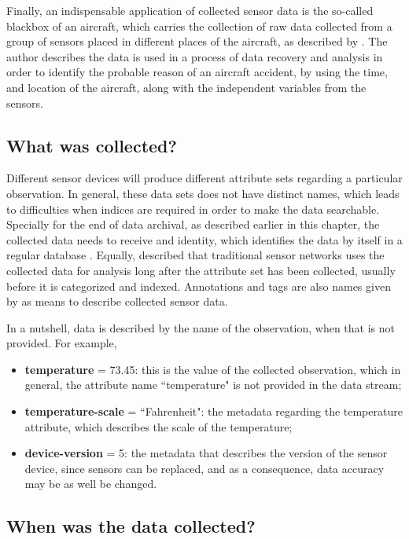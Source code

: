 Finally, an indispensable application of collected sensor data is the so-called
blackbox of an aircraft, which carries the collection of raw data collected
from a group of sensors placed in different places of the aircraft, as
described by \cite{sn-exemple-blackbox}. The author describes the data is used
in a process of data recovery and analysis in order to identify the probable
reason of an aircraft accident, by using the time, and location of the
aircraft, along with the independent variables from the sensors.

\subsection{What was collected?}

Different sensor devices will produce different attribute sets regarding a
particular observation. In general, these data sets does not have distinct
names, which leads to difficulties when indices are required in order to make
the data searchable. Specially for the end of data archival, as described
earlier in this chapter, the collected data needs to receive and identity,
which identifies the data by itself in a regular database
\cite{relational-model}. Equally, \cite{sn-provenance} described that
traditional sensor networks uses the collected data for analysis long after
the attribute set has been collected, usually before it is categorized and
indexed. Annotations and tags are also names given by \cite{sn-provenance} as
means to describe collected sensor data.

In a nutshell, data is described by the name of the observation, when that is
not provided. For example,

\begin{itemize}
  \item \textbf{temperature} = 73.45: this is the value of the collected
  observation, which in general, the attribute name ``temperature" is not
  provided in the data stream;
  \item \textbf{temperature-scale} = ``Fahrenheit": the metadata regarding the
  temperature attribute, which describes the scale of the temperature;
  \item \textbf{device-version} = 5: the metadata that describes the version of
  the sensor device, since sensors can be replaced, and as a consequence, data
  accuracy may be as well be changed.
\end{itemize} 

\subsection{When was the data collected?}

